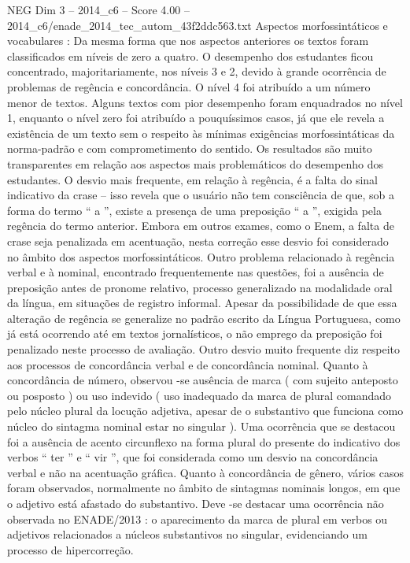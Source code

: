 \begin{textsample}{NEG Dim 3 – 2014\_c6 – Score 4.00 – 2014\_c6/enade\_2014\_tec\_autom\_43f2ddc563.txt}
Aspectos morfossintáticos e vocabulares : Da mesma forma que nos aspectos anteriores os textos foram classificados em níveis de zero a quatro.
O desempenho dos estudantes ficou concentrado, majoritariamente, nos níveis 3 e 2, devido à grande ocorrência de problemas de regência e concordância.
O nível 4 foi atribuído a um número menor de textos.
Alguns textos com pior desempenho foram enquadrados no nível 1, enquanto o nível zero foi atribuído a pouquíssimos casos, já que ele revela a existência de um texto sem o respeito às mínimas exigências morfossintáticas da norma-padrão e com comprometimento do sentido.
Os resultados são muito transparentes em relação aos aspectos mais problemáticos do desempenho dos estudantes.
O desvio mais frequente, em relação à regência, é a falta do sinal indicativo da crase – isso revela que o usuário não tem consciência de que, sob a forma do termo “ a ”, existe a presença de uma preposição “ a ”, exigida pela regência do termo anterior.
Embora em outros exames, como o Enem, a falta de crase seja penalizada em acentuação, nesta correção esse desvio foi considerado no âmbito dos aspectos morfossintáticos.
Outro problema relacionado à regência verbal e à nominal, encontrado frequentemente nas questões, foi a ausência de preposição antes de pronome relativo, processo generalizado na modalidade oral da língua, em situações de registro informal.
Apesar da possibilidade de que essa alteração de regência se generalize no padrão escrito da Língua Portuguesa, como já está ocorrendo até em textos jornalísticos, o não emprego da preposição foi penalizado neste processo de avaliação.
Outro desvio muito frequente diz respeito aos processos de concordância verbal e de concordância nominal.
Quanto à concordância de número, observou -se ausência de marca ( com sujeito anteposto ou posposto ) ou uso indevido ( uso inadequado da marca de plural comandado pelo núcleo plural da locução adjetiva, apesar de o substantivo que funciona como núcleo do sintagma nominal estar no singular ).
Uma ocorrência que se destacou foi a ausência de acento circunflexo na forma plural do presente do indicativo dos verbos “ ter ” e “ vir ”, que foi considerada como um desvio na concordância verbal e não na acentuação gráfica.
Quanto à concordância de gênero, vários casos foram observados, normalmente no âmbito de sintagmas nominais longos, em que o adjetivo está afastado do substantivo.
Deve -se destacar uma ocorrência não observada no ENADE/2013 : o aparecimento da marca de plural em verbos ou adjetivos relacionados a núcleos substantivos no singular, evidenciando um processo de hipercorreção.

\end{textsample}
